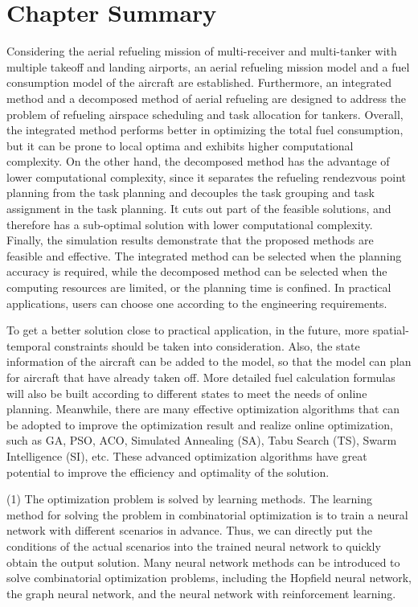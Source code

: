 \section{Chapter Summary}\label{sec_6}


Considering the aerial refueling mission of multi-receiver and multi-tanker with multiple takeoff and landing airports, an aerial refueling mission model and a fuel consumption model of the aircraft are established. Furthermore, an integrated method and a decomposed method of aerial refueling are designed to address the problem of refueling airspace scheduling and task allocation for tankers. Overall, the integrated method performs better in optimizing the total fuel consumption, but it can be prone to local optima and exhibits higher computational complexity. On the other hand, the decomposed method has the advantage of lower computational complexity, since it separates the refueling rendezvous point planning from the task planning and decouples the task grouping and task assignment in the task planning. It cuts out part of the feasible solutions, and therefore has a sub-optimal solution with lower computational complexity. Finally, the simulation results demonstrate that the proposed methods are feasible and effective. The integrated method can be selected when the planning accuracy is required, while the decomposed method can be selected when the computing resources are limited, or the planning time is confined. In practical applications, users can choose one according to the engineering requirements.

To get a better solution close to practical application, in the future, more spatial-temporal constraints should be taken into consideration.  Also, the state information of the aircraft can be added to the model, so that the model can plan for aircraft that have already taken off. More detailed fuel calculation formulas will also be built according to different states to meet the needs of online planning. Meanwhile, there are many effective optimization algorithms that can be adopted to improve the optimization result and realize online optimization, such as GA, PSO, ACO, Simulated Annealing (SA), Tabu Search (TS), Swarm Intelligence (SI), etc. These advanced optimization algorithms have great potential to improve the efficiency and optimality of the solution.

(1) The optimization problem is solved by learning methods. The learning method for solving the problem in combinatorial optimization is to train a neural network with different scenarios in advance. Thus, we can directly put the conditions of the actual scenarios into the trained neural network to quickly obtain the output solution. Many neural network methods can be introduced to solve combinatorial optimization problems, including the Hopfield neural network, the graph neural network, and the neural network with reinforcement learning. \cite{shi2022neural}


